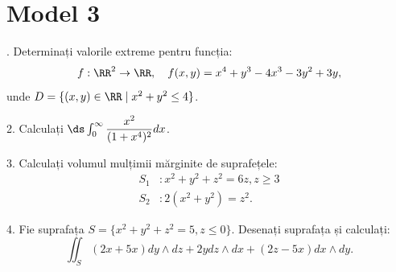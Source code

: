 \section{Model 3}

\indent{}. Determinați valorile extreme pentru funcția:
\[
  f : \RR^2 \to \RR, \quad f(x, y) = x^4 + y^3 - 4x^3 - 3y^2 + 3y,
\]
unde $ D = \{(x, y) \in \RR \mid x^2 + y^2 \leq 4 \} $.

\vspace{1cm}

2. Calculați $ \ds\int_0^\infty \dfrac{x^2}{(1 + x^4)^2} dx $.

\vspace{1cm}

3. Calculați volumul mulțimii mărginite de suprafețele:
\begin{align*}
  S_1 &: x^2 + y^2 + z^2 = 6z, z \geq 3 \\
  S_2 &: 2(x^2 + y^2) = z^2.
\end{align*}

\vspace{1cm}

4. Fie suprafața $ S = \{ x^2 + y^2 + z^2 = 5, z \leq 0 \} $.
Desenați suprafața și calculați:
\[
  \iint_S (2x + 5x) dy \wedge dz + 2ydz \wedge dx + (2z - 5x) dx \wedge dy.
\]


